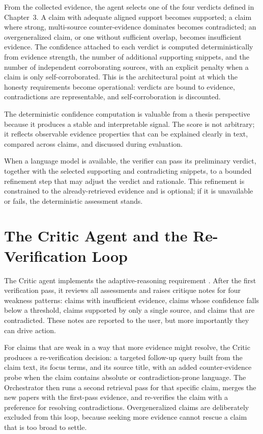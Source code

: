 From the collected evidence, the agent selects one of the four verdicts defined in Chapter~3. A claim with
adequate aligned support becomes supported; a claim where strong, multi-source counter-evidence dominates becomes
contradicted; an overgeneralized claim, or one without sufficient overlap, becomes insufficient evidence. The
confidence attached to each verdict is computed deterministically from evidence strength, the number of additional
supporting snippets, and the number of independent corroborating sources, with an explicit penalty when a claim is
only self-corroborated. This is the architectural point at which the honesty requirements become operational:
verdicts are bound to evidence, contradictions are representable, and self-corroboration is discounted.

The deterministic confidence computation is valuable from a thesis perspective because it produces a stable and
interpretable signal. The score is not arbitrary; it reflects observable evidence properties that can be explained
clearly in text, compared across claims, and discussed during evaluation.

When a language model is available, the verifier can pass its preliminary verdict, together with the selected
supporting and contradicting snippets, to a bounded refinement step that may adjust the verdict and rationale. This
refinement is constrained to the already-retrieved evidence and is optional; if it is unavailable or fails, the
deterministic assessment stands.

\section{The Critic Agent and the Re-Verification Loop }

The Critic agent implements the adaptive-reasoning requirement \cite{shinn2023reflexion,yao2023treeofthoughts,asai2024selfrag}. After the first verification pass, it reviews all
assessments and raises critique notes for four weakness patterns: claims with insufficient evidence, claims whose
confidence falls below a threshold, claims supported by only a single source, and claims that are contradicted.
These notes are reported to the user, but more importantly they can drive action.

For claims that are weak in a way that more evidence might resolve, the Critic produces a re-verification decision:
a targeted follow-up query built from the claim text, its focus terms, and its source title, with an added
counter-evidence probe when the claim contains absolute or contradiction-prone language. The Orchestrator then
runs a second retrieval pass for that specific claim, merges the new papers with the first-pass evidence, and
re-verifies the claim with a preference for resolving contradictions. Overgeneralized claims are deliberately
excluded from this loop, because seeking more evidence cannot rescue a claim that is too broad to settle.

